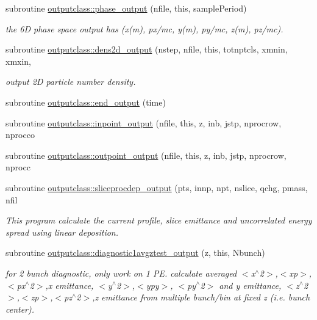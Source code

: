 \begin{DoxyCompactItemize}
subroutine \mbox{\hyperlink{namespaceoutputclass_a86742b646a584647da7837ee6fc09c89}{outputclass\+::phase\+\_\+output}} (nfile, this, sample\+Period)
\begin{DoxyCompactList}\small\item\em the 6D phase space output has (x(m), px/mc, y(m), py/mc, z(m), pz/mc). \end{DoxyCompactList}\item 
subroutine \mbox{\hyperlink{namespaceoutputclass_ab7f55098e75e7410bbbb6ffa50148508}{outputclass\+::dens2d\+\_\+output}} (nstep, nfile, this, totnptcls, xmnin, xmxin,
\begin{DoxyCompactList}\small\item\em output 2D particle number density. \end{DoxyCompactList}\item 
subroutine \mbox{\hyperlink{namespaceoutputclass_af40e04d104fbdb28b9cae7fb5fcba121}{outputclass\+::end\+\_\+output}} (time)
\item 
subroutine \mbox{\hyperlink{namespaceoutputclass_a9fcc4b33aa3d9bee76ef32e6708293b1}{outputclass\+::inpoint\+\_\+output}} (nfile, this, z, inb, jstp, nprocrow, nprocco
\item 
subroutine \mbox{\hyperlink{namespaceoutputclass_a14e60e5c44149548fa7843b51c625969}{outputclass\+::outpoint\+\_\+output}} (nfile, this, z, inb, jstp, nprocrow, nprocc
\item 
subroutine \mbox{\hyperlink{namespaceoutputclass_aaba51e45761070d95883093a25e402c4}{outputclass\+::sliceprocdep\+\_\+output}} (pts, innp, npt, nslice, qchg, pmass, nfil
\begin{DoxyCompactList}\small\item\em This program calculate the current profile, slice emittance and uncorrelated energy spread using linear deposition. \end{DoxyCompactList}\item 
subroutine \mbox{\hyperlink{namespaceoutputclass_a17a23eedc331f6e6b2ca0543119aca42}{outputclass\+::diagnostic1avgztest\+\_\+output}} (z, this, Nbunch)
\begin{DoxyCompactList}\small\item\em for 2 bunch diagnostic, only work on 1 PE. calculate averaged $<$x$^\wedge$2$>$,$<$xp$>$,$<$px$^\wedge$2$>$,x emittance, $<$y$^\wedge$2$>$,$<$ypy$>$, $<$py$^\wedge$2$>$ and y emittance, $<$z$^\wedge$2$>$,$<$zp$>$,$<$pz$^\wedge$2$>$,z emittance from multiple bunch/bin at fixed z (i.\+e. bunch center). \end{DoxyCompactList}\end{DoxyCompactItemize}
